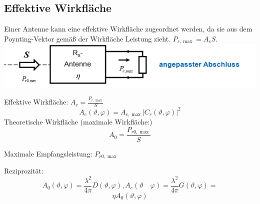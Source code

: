 \documentclass[english]{latex4ei/latex4ei_sheet}
\begin{document}
\begin{sectionbox}
    \subsection{Effektive Wirkfläche}
    Einer Antenne kann eine effektive Wirkfläche zugeordnet werden, da sie aus dem Poynting-Vektor gemäß der Wirkfläche Leistung zieht. $P_{r,\max} = A_e S$.\\
    \includegraphics[width=\textwidth]{./img/antenne_eff_flaeche.png}
    \begin{emphbox}
        Effektive Wirkfläche: $A_e = \frac{P_{r,\max}}{S}$
        $$
            A_{e}(\vartheta, \varphi)=A_{e, \max }\left|C_{r}(\vartheta, \varphi)\right|^{2}
        $$
        Theoretische Wirkfläche (maximale Wirkfläche:)
        $$A_0 = \frac{P_{r0, \max}}{S}$$

        Maximale Empfangsleistung: $P_{r0, \max}$


        Reziprozität:
        $$
            A_{0}(\vartheta, \varphi)=\frac{\lambda^{2}}{4 \pi} D(\vartheta, \varphi), A_{e}(\vartheta \quad \varphi)=\frac{\lambda^{2}}{4 \pi} G(\vartheta, \varphi)=$$
        $$
            \eta A_{0}(\vartheta, \varphi)
        $$
    \end{emphbox}
\end{sectionbox}
\end{document}

